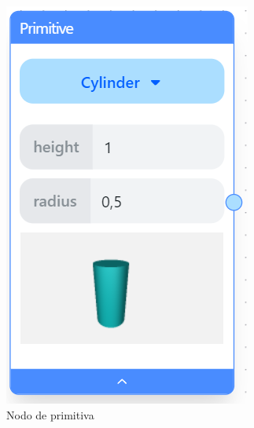 \begin{figure}[!h]
    \centering
    \begin{subfigure}[b]{0.31\textwidth}
        \centering
        \includegraphics[width=\textwidth]{Plantilla-TFG-master/img/nodo_primitiva.png}
        \caption{Nodo de primitiva}
    \end{subfigure}
    \hspace{15pt}
    \begin{subfigure}[b]{0.32\textwidth}
        \centering

\end{subfigure}
\end{figure}
